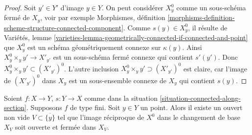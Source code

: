 \begin{proof}
Soit $y' \in Y'$ d'image $y \in Y$. On peut considérer
$X^0_y$ comme un sous-schéma fermé de $X_y$, voir par exemple
Morphismes,
définition \ref{morphisms-definition-scheme-structure-connected-component}.
Comme $s(y) \in X^0_y$, il résulte de
Variétés, lemme
\ref{varieties-lemma-geometrically-connected-if-connected-and-point}
que $X_y^0$ est un schéma géométriquement connexe sur $\kappa(y)$.
Ainsi $X_y^0 \times_y y' \to X'_{y'}$ est un sous-schéma fermé connexe
qui contient $s'(y')$. Donc $X_y^0 \times_y y' \subset (X'_{y'})^0$.
L'autre inclusion $X_y^0 \times_y y' \supset (X'_{y'})^0$ est claire,
car l'image de $(X'_{y'})^0$ dans $X_y$ est un sous-ensemble connexe de $X_y$ qui
contient $s(y)$.
\end{proof}

\begin{lemma}
\label{lemma-connected-along-section-good}
Soient $f : X \to Y$, $s : Y \to X$ comme dans la
situation \ref{situation-connected-along-section}.
Supposons $f$ de type fini. Soit $y \in Y$ un point.
Alors il existe un ouvert non vide $V \subset \overline{\{y\}}$ tel que
l'image réciproque de $X^0$ dans le changement de base $X_V$ soit ouverte et fermée dans
$X_V$.
\end{lemma}

